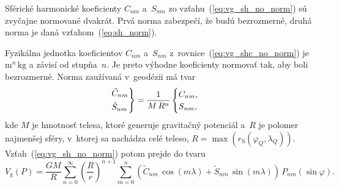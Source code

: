 \documentclass[a4paper,12pt]{book}
\newcommand{\gidx}{\mathrm g}
\begin{document}
Sférické harmonické koeficienty $C_{nm}$ a~$S_{nm}$ zo
vzťahu~(\ref{eq:vg_sh_no_norm}) sú zvyčajne normované dvakrát.  Prvá norma
zabezpečí, že budú bezrozmerné, druhá norma je daná vzťahom~(\ref{eq:sh_norm}).

Fyzikálna jednotka koeficientov $C_{nm}$ a~$S_{nm}$
z~rovnice~(\ref{eq:vg_shc_no_norm}) je $\mathrm{m}^n \, \mathrm{kg}$ a závisí 
od stupňa~$n$.  Je preto výhodne koeficienty normovať tak, aby boli
bezrozmerné.  Norma zaužívaná v~geodézii má tvar
%
\begin{equation}
\begin{rcases}
\tilde{C}_{nm}\\
\tilde{S}_{nm}
\end{rcases}
= \frac{1}{M \, R^n}
\begin{cases}
C_{nm}{,}\\
S_{nm}{,}
\end{cases}
\end{equation}
%
kde $M$ je hmotnosť telesa, ktoré generuje gravitačný potenciál a~$R$ je
polomer najmenšej sféry, v~ktorej sa nachádza celé teleso, $R
= \max(r_\mathrm{S}(\varphi_Q, \lambda_Q))$.  Vzťah~(\ref{eq:vg_sh_no_norm})
potom prejde do tvaru
%
\begin{equation}
\label{eq:vg_sh_1st_norm}
V_\gidx(P) = \frac{GM}{R} \sum_{n = 0}^\infty \left( \frac{R}{r} \right)^{n
+ 1} \sum_{m = 0}^{n} \left( \tilde{C}_{nm} \, \cos(m\lambda) + \tilde{S}_{nm}
\, \sin(m\lambda)\right) \, P_{nm}(\sin\varphi){.}
\end{equation}
\end{document}
